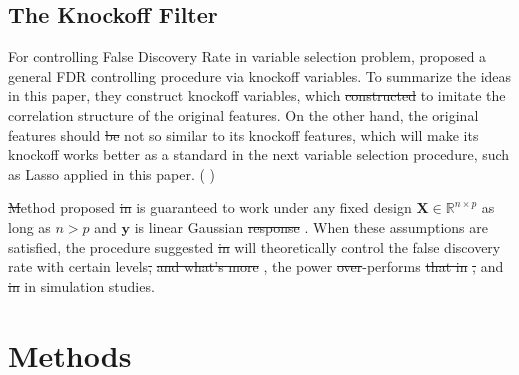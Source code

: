 \documentclass{uwstat572}
\newcommand{\vmdel}[1]{\sout{#1}}
\newcommand{\vmadd}[1]{\textbf{\color{red}{#1}}}
\newcommand{\vmcomment}[1]{({\color{blue}{VM's comment:}} \textbf{\color{blue}{#1}})}
\begin{document}
\subsection{The Knockoff Filter}
For controlling False Discovery Rate in \vmadd{the} variable selection problem, \cite{barber2015controlling} proposed a general FDR controlling procedure via knockoff variables. To summarize the ideas in this paper, they construct knockoff variables, which \vmdel{constructed} \vmadd{formed} to imitate the correlation structure of the original features. 
On the other hand, the original features should \vmdel{be} not \vmadd{be} so similar to its knockoff features, which will make its knockoff works better as a standard in the next variable selection procedure, such as Lasso \cite{tibshirani1996regression} applied in this paper.
\vmcomment{There is lot going on in the last sentence; break it into two or more sentences and explain clearly.}

\vmadd{The} \vmdel{M}\vmadd{m}ethod proposed \vmdel{in} \vmadd{by} \cite{barber2015controlling} is guaranteed to work under any fixed design $\bm{X} \in \mathbb{R}^{n\times p}$ as long as $n>p$ and $\bm{y}$ is \vmadd{a} linear \vmadd{function of covariates with added} Gaussian \vmdel{response} \vmadd{noise}. 
When these assumptions are satisfied, the procedure suggested \vmdel{in} \vmadd{by} \cite{barber2015controlling} will theoretically control the false discovery rate with certain levels\vmdel{,} \vmadd{.} \vmdel{and what's more} \vmadd{Moreover}, the power \vmadd{of the knockoff filter} \vmdel{over}\vmadd{out}-performs \vmdel{that in} \vmadd{the power of} \cite{benjamini1995controlling}\vmadd{'s}\vmdel{,} and \vmdel{in} \cite{benjamini2001control}\vmadd{'s,} in simulation studies.

\section{Methods}
\end{document}
